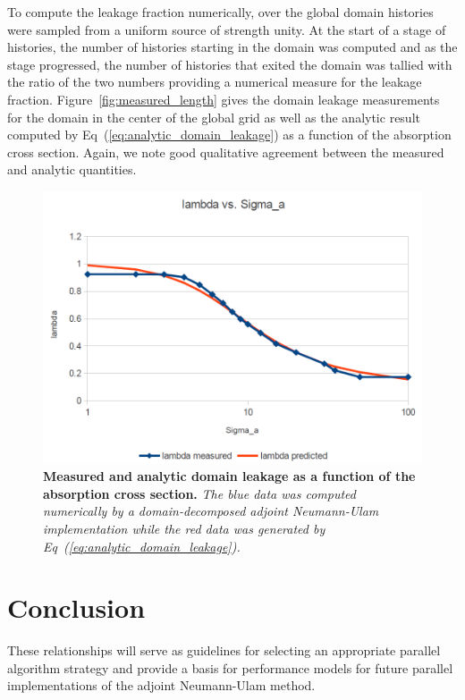 \documentclass[letterpaper,12pt]{article}
\begin{document}
To compute the leakage fraction numerically, over the global domain
 histories were sampled from a uniform source of strength
unity. At the start of a stage of histories, the number of histories
starting in the domain was computed and as the stage progressed, the
number of histories that exited the domain was tallied with the ratio
of the two numbers providing a numerical measure for the leakage
fraction. Figure~\ref{fig:measured_length} gives the domain leakage
measurements for the domain in the center of the global grid as well
as the analytic result computed by
Eq~(\ref{eq:analytic_domain_leakage}) as a function of the absorption
cross section. Again, we note good qualitative agreement between the
measured and analytic quantities.
\begin{figure}[t!]
  \begin{center}
    \includegraphics[width=5in,clip]{measured_leakage.png}
  \end{center}
  \caption{\textbf{Measured and analytic domain leakage as a function
      of the absorption cross section.} \textit{The blue data was
      computed numerically by a domain-decomposed adjoint Neumann-Ulam
      implementation while the red data was generated by
      Eq~(\ref{eq:analytic_domain_leakage}).}}
  \label{fig:measured_leakage.}
\end{figure}

\section{Conclusion}
These relationships will serve as guidelines for selecting an
appropriate parallel algorithm strategy and provide a basis for
performance models for future parallel implementations of the adjoint
Neumann-Ulam method.

\pagebreak


\end{document}
